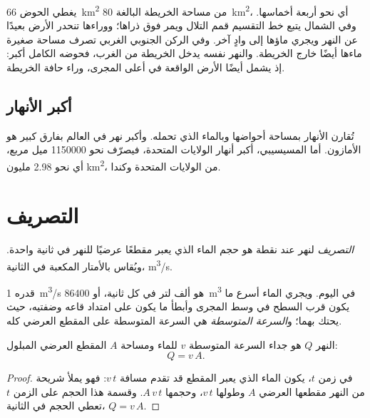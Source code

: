 يغطي الحوض \qty{66}{km^2} من مساحة الخريطة البالغة \qty{80}{km^2}، أي نحو
أربعة أخماسها. وفي الشمال يتبع خط التقسيم قمم التلال ويمر فوق ذراها؛ ووراءها تنحدر
الأرض بعيدًا عن النهر ويجري ماؤها إلى وادٍ آخر. وفي الركن الجنوبي الغربي تصرف مساحة
صغيرة ماءها أيضًا خارج الخريطة. والنهر نفسه يدخل الخريطة من الغرب، فحوضه الكامل
أكبر: إذ يشمل أيضًا الأرض الواقعة في أعلى المجرى، وراء حافة
الخريطة.

\subsection*{أكبر الأنهار}

تُقارن الأنهار بمساحة أحواضها وبالماء الذي تحمله. وأكبر نهر في العالم بفارق كبير هو
الأمازون. أما المسيسيبي، أكبر أنهار الولايات المتحدة، فيصرّف نحو \num{1150000}
ميل مربع، أي نحو 2.98 مليون \unit{km^2}، من الولايات المتحدة
وكندا.

\section{التصريف}

\begin{definition}[التصريف]\label{def:g10:drainage-basins:discharge}
\emph{التصريف} لنهر عند نقطة هو حجم الماء الذي يعبر مقطعًا عرضيًا
للنهر في ثانية واحدة. ويُقاس بالأمتار المكعبة في الثانية،
\unit{m^3/s}.
\end{definition}

 قدره \qty{1}{m^3/s} هو ألف لتر في كل ثانية، أو
\qty{86400}{m^3} في اليوم. ويجري الماء أسرع ما يكون قرب السطح في وسط المجرى وأبطأ ما
يكون على امتداد قاعه وضفتيه، حيث يحتك بهما؛ و\emph{السرعة المتوسطة} هي السرعة
المتوسطة على المقطع العرضي
كله.

\begin{proposition}\label{prop:g10:drainage-basins:discharge}
 النهر $Q$ هو جداء السرعة المتوسطة $v$ للماء ومساحة $A$ المقطع العرضي
المبلول:
\[
Q = v\,A.
\]
\end{proposition}

\begin{proof}
في زمن $t$، يكون الماء الذي يعبر المقطع قد تقدم مسافة
$v\,t$: فهو يملأ شريحة من النهر مقطعها العرضي $A$ وطولها
$v\,t$، وحجمها $A\,v\,t$. وقسمة هذا الحجم على الزمن $t$
تعطي الحجم في الثانية، $Q = v\,A$.
\end{proof}

